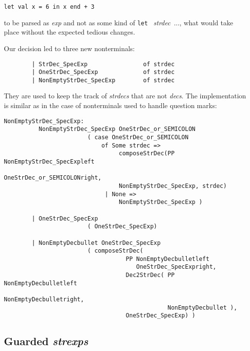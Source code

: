 \begin{center}
{\small
\begin{verbatim}
let val x = 6 in x end + 3
\end{verbatim}}
\end{center}

\noindent to be parsed as {\it exp} and not as some kind of {\tt let}~{\it
  strdec}~..., what would take place without the expected tedious
  changes.

Our decision led to three new nonterminals:
{\small
\begin{verbatim}
        | StrDec_SpecExp                of strdec
        | OneStrDec_SpecExp             of strdec
        | NonEmptyStrDec_SpecExp        of strdec
\end{verbatim}}

  \noindent They are used to keep the track of {\it strdecs} that are
  not {\it decs}. The implementation is similar as in the case of
  nonterminals used to handle question marks: {\small
\begin{verbatim}
NonEmptyStrDec_SpecExp:
          NonEmptyStrDec_SpecExp OneStrDec_or_SEMICOLON
                        ( case OneStrDec_or_SEMICOLON
                            of Some strdec =>
                                 composeStrDec(PP NonEmptyStrDec_SpecExpleft
                                                  OneStrDec_or_SEMICOLONright,
                                 NonEmptyStrDec_SpecExp, strdec)
                             | None =>
                                 NonEmptyStrDec_SpecExp )

        | OneStrDec_SpecExp
                        ( OneStrDec_SpecExp)

        | NonEmptyDecbullet OneStrDec_SpecExp
                        ( composeStrDec(
                                   PP NonEmptyDecbulletleft
                                      OneStrDec_SpecExpright,
                                   Dec2StrDec( PP NonEmptyDecbulletleft
                                                  NonEmptyDecbulletright,
                                               NonEmptyDecbullet ), 
                                   OneStrDec_SpecExp) )
\end{verbatim}}


\subsection{Guarded {\it strexps}}
\label{sec:guarded}


